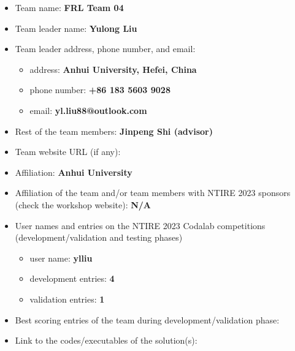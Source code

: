 \documentclass[10pt,twocolumn,letterpaper]{article}
\begin{document}
\begin{itemize}
	\item Team name: \textbf{FRL Team 04}                                    
	\item Team leader name: \textbf{Yulong Liu}                               
	\item Team leader address, phone number, and email:
	\begin{itemize}
		\item address: \textbf{Anhui University, Hefei, China}
		\item phone number: \textbf{+86 183 5603 9028}
		\item email: \textbf{yl.liu88@outlook.com}
	\end{itemize}
	\item Rest of the team members: \textbf{Jinpeng Shi (advisor)}                   
	\item Team website URL (if any): \\                                
	\item Affiliation: \textbf{Anhui University}
	\item Affiliation of the team and/or team members with NTIRE 2023 sponsors (check the workshop website): \textbf{N/A}
	\item User names and entries on the NTIRE 2023 Codalab competitions (development/validation and testing phases)    \begin{itemize}
		\item user name: \textbf{ylliu}
		\item development entries: \textbf{4}
		\item validation entries: \textbf{1}
	\end{itemize}
	\item Best scoring entries of the team during development/validation phase:
	\begin{table}[h]
		\centering
	\end{table}
	\item Link to the codes/executables of the solution(s): \\ 
\end{itemize}
\end{document}
